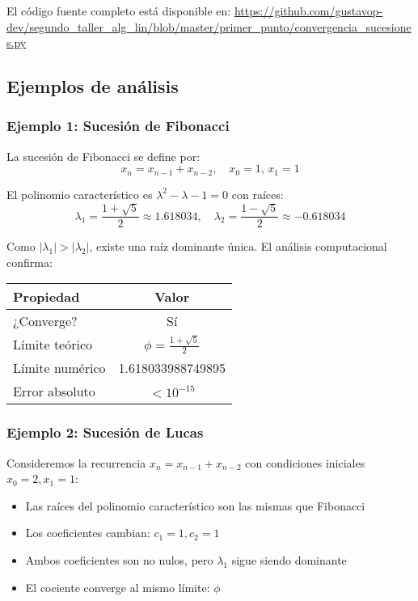 \documentclass[12pt]{article}
\begin{document}
El código fuente completo está disponible en: \url{https://github.com/gustavop-dev/segundo_taller_alg_lin/blob/master/primer_punto/convergencia_sucesiones.py}

\subsection{Ejemplos de análisis}

\subsubsection{Ejemplo 1: Sucesión de Fibonacci}

La sucesión de Fibonacci se define por:
\[
x_n = x_{n-1} + x_{n-2}, \quad x_0 = 1, \, x_1 = 1
\]

El polinomio característico es $\lambda^2 - \lambda - 1 = 0$ con raíces:
\[
\lambda_1 = \frac{1 + \sqrt{5}}{2} \approx 1.618034, \quad \lambda_2 = \frac{1 - \sqrt{5}}{2} \approx -0.618034
\]

Como $|\lambda_1| > |\lambda_2|$, existe una raíz dominante única. El análisis computacional confirma:

\begin{center}
\begin{tabular}{|l|c|}
\hline
\textbf{Propiedad} & \textbf{Valor} \\
\hline
¿Converge? & Sí \\
Límite teórico & $\phi = \frac{1+\sqrt{5}}{2}$ \\
Límite numérico & 1.618033988749895 \\
Error absoluto & $< 10^{-15}$ \\
\hline
\end{tabular}
\end{center}

\subsubsection{Ejemplo 2: Sucesión de Lucas}

Consideremos la recurrencia $x_n = x_{n-1} + x_{n-2}$ con condiciones iniciales $x_0 = 2, x_1 = 1$:

\begin{itemize}
    \item Las raíces del polinomio característico son las mismas que Fibonacci
    \item Los coeficientes cambian: $c_1 = 1, c_2 = 1$
    \item Ambos coeficientes son no nulos, pero $\lambda_1$ sigue siendo dominante
    \item El cociente converge al mismo límite: $\phi$
\end{itemize}
\end{document}
